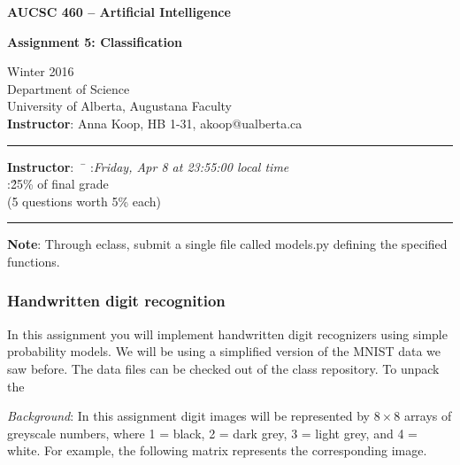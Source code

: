 \documentclass[12pt]{article}
\begin{document}
\noindent
{\Large\bf AUCSC 460 -- Artificial Intelligence}

\vspace*{1\baselineskip}

\noindent
{\large\bf Assignment 5: Classification}

\vspace*{1\baselineskip}

\noindent
Winter 2016\\
Department of Science\\
University of Alberta, Augustana Faculty\\
{\bf Instructor}: Anna Koop, HB 1-31, akoop@ualberta.ca

\vspace*{1.75\baselineskip}
\hrule

\begin{tabbing}
{\bf Instructor}:\ \ \=\kill
{}:\'{\em Friday, Apr 8 at 23:55:00 local time}
\\
:\' 25\% of final grade \\
\>(5 questions worth 5\% each)
\end{tabbing}

\hrule

\vspace*{1.25\baselineskip}

\noindent
{\bf Note}:
Through eclass, submit a single file called models.py defining the specified functions.

\subsubsection*{Handwritten digit recognition}

In this assignment you will implement handwritten digit recognizers using simple probability models.
We will be using a simplified version of the MNIST data we saw before. The data files can be checked out of the class repository. To unpack the 

\bigskip

\noindent
{\em Background}:
In this assignment digit images will be represented by $8\times8$
arrays of greyscale numbers, where
1 = black, 2 = dark grey, 3 = light grey, and 4 = white.
For example, the following matrix represents the corresponding image.

\bigskip
\end{document}
